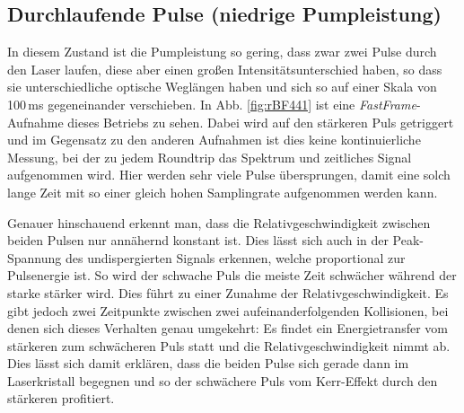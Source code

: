\documentclass[bachelor,       %
               twoside,        %
               BCOR10mm,       %
               english,ngerman, %
               ]{GAUBM}
\begin{document}
\subsection{Durchlaufende Pulse (niedrige Pumpleistung)}
In diesem Zustand ist die Pumpleistung so gering, dass zwar zwei Pulse durch den Laser laufen, diese aber einen großen Intensitätsunterschied haben, so dass sie unterschiedliche optische Weglängen haben und sich so auf einer Skala von 100\,ms gegeneinander verschieben.
In Abb. \ref{fig:rBF441} ist eine \textit{FastFrame}-Aufnahme dieses Betriebs zu sehen.
Dabei wird auf den stärkeren Puls getriggert und im Gegensatz zu den anderen Aufnahmen ist dies keine kontinuierliche Messung, bei der zu jedem Roundtrip das Spektrum und zeitliches Signal aufgenommen wird.
Hier werden sehr viele Pulse übersprungen, damit eine solch lange Zeit mit so einer gleich hohen Samplingrate aufgenommen werden kann.

Genauer hinschauend erkennt man, dass die Relativgeschwindigkeit zwischen beiden Pulsen nur annähernd konstant ist.
Dies lässt sich auch in der Peak-Spannung des undispergierten Signals erkennen, welche proportional zur Pulsenergie ist.
So wird der schwache Puls die meiste Zeit schwächer während der starke stärker wird.
Dies führt zu einer Zunahme der Relativgeschwindigkeit.
Es gibt jedoch zwei Zeitpunkte zwischen zwei aufeinanderfolgenden Kollisionen, bei denen sich dieses Verhalten genau umgekehrt: Es findet ein Energietransfer vom stärkeren zum schwächeren Puls statt und die Relativgeschwindigkeit nimmt ab.
Dies lässt sich damit erklären, dass die beiden Pulse sich gerade dann im Laserkristall begegnen und so der schwächere Puls vom Kerr-Effekt durch den stärkeren profitiert.
\end{document}
